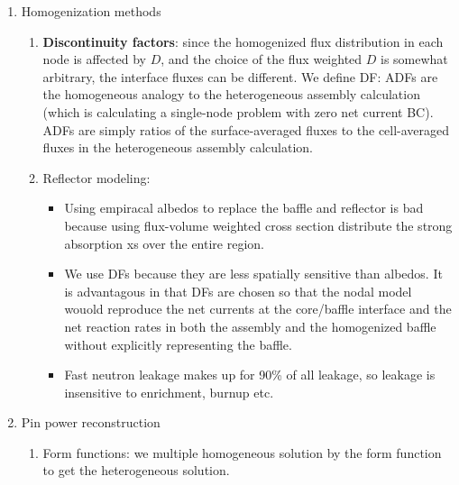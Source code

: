 \documentclass{school-22.211-notes}
\begin{document}
\begin{enumerate}
\item Homogenization methods
  \begin{enumerate}
    \item \textbf{Discontinuity factors}: since the homogenized flux distribution in each node is affected by $D$, and the choice of the flux weighted $D$ is somewhat arbitrary, the interface fluxes can be different. We define DF: 
      ADFs are the homogeneous analogy to the heterogeneous assembly calculation (which is calculating a single-node problem with zero net current BC). ADFs are simply ratios of the surface-averaged fluxes to the cell-averaged fluxes in the heterogeneous assembly calculation.

    \item Reflector modeling: 
      \begin{itemize}
      \item Using empiracal albedos to replace the baffle and reflector is bad because using flux-volume weighted cross section distribute the strong absorption xs over the entire region. 
      \item We use DFs because they are less spatially sensitive than albedos. It is advantagous in that DFs are chosen so that the nodal model wouold reproduce the net currents at the core/baffle interface and the net reaction rates in both the assembly and the homogenized baffle without explicitly representing the baffle. 
      \item Fast neutron leakage makes up for 90\% of all leakage, so leakage is insensitive to enrichment, burnup etc. 
      \end{itemize}
  \end{enumerate}

\item Pin power reconstruction
  \begin{enumerate}
    \item Form functions: we multiple homogeneous solution by the form function to get the heterogeneous solution. 


\end{enumerate}
\end{enumerate}
\end{document}
